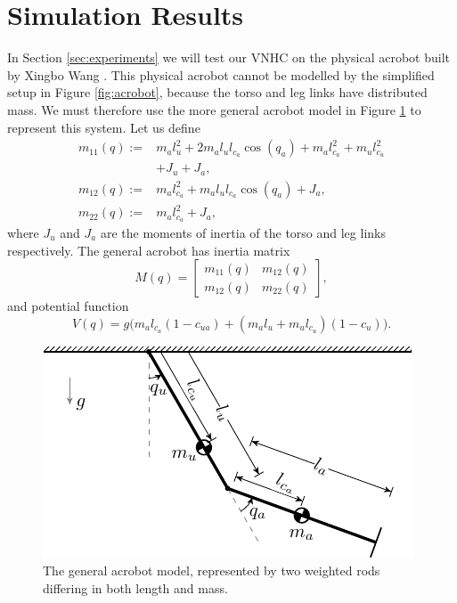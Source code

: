 \documentclass[journal,twoside,onecolumn,draftclsnofoot,web]{ieeecolor}
\begin{document}
{%
\section{Simulation Results}\label{sec:simulations}
In Section \ref{sec:experiments} we will test our VNHC on the physical acrobot
built by Xingbo Wang \cite{xingbo_thesis}.
This physical acrobot cannot be modelled by the simplified setup in Figure
\ref{fig:acrobot}, because the torso and leg links have 
distributed mass. 
We must therefore use the more general acrobot model in Figure
\ref{fig:acrobot-model} to represent this system.
Let us define 
\begin{align*}
    m_{11}(q) := &m_a l_u^2 + 2m_al_ul_{c_a}\cos(q_a) + m_al_{c_a}^2 +
    m_ul_{c_u}^2 \\
                 &+ J_u + J_a
                 , \\
    m_{12}(q) := &m_al_{c_a}^2 + m_al_ul_{c_a}\cos(q_a) + J_a
    , \\
    m_{22}(q) := &m_al_{c_a}^2 + J_a,
\end{align*}
where \(J_u\) and \(J_a\) are the moments of inertia of the torso and leg links
respectively. 
The general acrobot has inertia matrix
\begin{equation*}
    M(q) = \begin{bmatrix}
        m_{11}(q) & m_{12}(q) \\
        m_{12}(q) & m_{22}(q)
    \end{bmatrix}
    ,
\end{equation*}
and potential function
\begin{equation*}
    V(q) = g\big(m_al_{c_a}(1-c_{ua})
    + (m_al_u + m_ul_{c_u})(1-c_u)\big)
    .
\end{equation*}

\begin{figure}
    \centering
    \includegraphics[width=0.8\linewidth]{acrobot_model.pdf}
    \caption{The general acrobot model, represented by two weighted rods
    differing in both length and mass.}%
    \label{fig:acrobot-model}
\end{figure}

}
\end{document}

